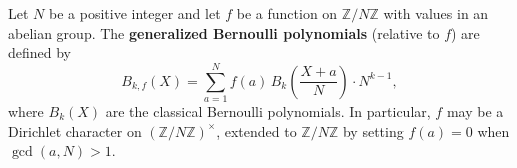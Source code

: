 Let $N$ be a positive integer and let $f$ be a function on $\mathbb{Z}/N\mathbb{Z}$ with values in an abelian group. The \textbf{generalized Bernoulli polynomials} (relative to $f$) are defined by
$$B_{k,f}(X) = \sum_{a=1}^{N} f(a) \, B_k\!\left(\frac{X + a}{N}\right) \cdot N^{k-1},$$
where $B_k(X)$ are the classical Bernoulli polynomials. In particular, $f$ may be a Dirichlet character on $(\mathbb{Z}/N\mathbb{Z})^{\times}$, extended to $\mathbb{Z}/N\mathbb{Z}$ by setting $f(a) = 0$ when $\gcd(a,N) > 1$.
